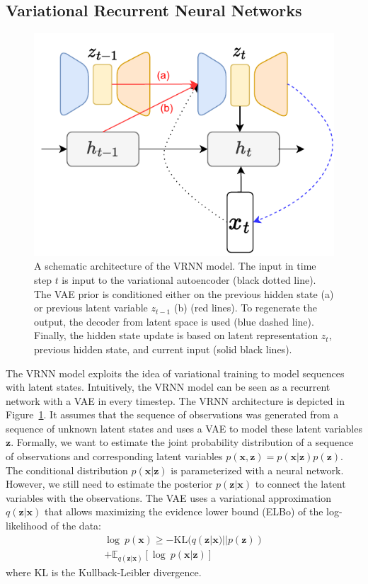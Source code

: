 \subsection{Variational Recurrent Neural Networks}
\label{02:sec:vrnn}
\begin{figure}
    \centering
    \includegraphics{images/DVRNN.pdf}
    \caption{A schematic architecture of the VRNN model. The input in time step $t$ is input to the variational autoencoder (black dotted line). The VAE prior is conditioned either on the previous hidden state (a) or previous latent variable $z_{t-1}$ (b) (red lines). To regenerate the output, the decoder from latent space is used (blue dashed line). Finally, the hidden state update is based on latent representation $z_t$, previous hidden state, and current input (solid black lines).}
    \label{fig:DVRNN}
\end{figure}
The VRNN model \cite{chung2015recurrent} exploits the idea of variational training to model sequences with latent states.
Intuitively, the VRNN model can be seen as a recurrent network with a VAE in every timestep.
The VRNN architecture is depicted in Figure~\ref{fig:DVRNN}.
It assumes that the sequence of observations was generated from a sequence of unknown latent states and uses a VAE to model these latent variables $\mathbf{z}$.
Formally, we want to estimate the joint probability distribution of a sequence of observations and corresponding latent variables $p(\mathbf{x}, \mathbf{z}) = p(\mathbf{x}|\mathbf{z})p(\mathbf{z})$.
The conditional distribution $p(\mathbf{x}|\mathbf{z})$ is parameterized with a neural network.
However, we still need to estimate the posterior $p(\mathbf{z}|\mathbf{x})$ to connect the latent variables with the observations.
The VAE uses a variational approximation $q(\mathbf{z}|\mathbf{x})$ that allows maximizing the evidence lower bound (ELBo) of the log-likelihood of the data:
\begin{equation}
\begin{split}
    \log~p(\mathbf{x}) \ge -\mathrm{KL}(q(\mathbf{z}|\mathbf{x})||p(\mathbf{z}))\\ + \mathbb{E}_{q(\mathbf{z}|\mathbf{x})}[\log~p(\mathbf{x}|\mathbf{z})]
    \label{eq:vae}
\end{split}
\end{equation}
where KL is the Kullback-Leibler divergence.

